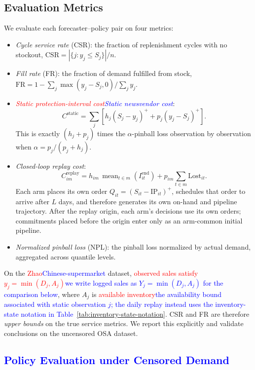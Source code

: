 \documentclass[msom,dblanonrev]{informs4}
\newcommand{\add}[1]{\textcolor{blue}{#1}}
\newcommand{\reduce}[1]{\textcolor{red}{#1}\hspace{0.5em}}
\begin{document}
\subsection{Evaluation Metrics}

We evaluate each forecaster--policy pair on four metrics:

\begin{itemize}
\item \emph{Cycle service rate} (CSR): the fraction of replenishment cycles with no stockout, $\text{CSR} = |\{j : y_j \leq S_j\}| / n$.
\item \emph{Fill rate} (FR): the fraction of demand fulfilled from stock, $\text{FR} = 1 - \sum_j \max(y_j - S_j, 0) / \sum_j y_j$.
\item \reduce{\emph{Static protection-interval cost}}\add{\emph{Static newsvendor cost}}:
  \[
  C^{\mathrm{static}} = \sum_j \left[h_j (S_j-y_j)^+ + p_j (y_j-S_j)^+\right].
  \]
  This is exactly $(h_j+p_j)$ times the $\alpha$-pinball loss observation by observation when $\alpha=p_j/(p_j+h_j)$.
\item \emph{Closed-loop replay cost}:
  \[
  C^{\mathrm{replay}}_{im}
  =h_{im}\,\operatorname{mean}_{t\in m}(I^{\mathrm{end}}_{it})
   +p_{im}\sum_{t\in m}\mathrm{Lost}_{it}.
  \]
  Each arm places its own order $Q_{it}=(S_{it}-\mathrm{IP}_{it})^+$, schedules that order to arrive after $L$ days, and therefore generates its own on-hand and pipeline trajectory.
  After the replay origin, each arm's decisions use its own orders; commitments placed before the origin enter only as an arm-common initial pipeline.
\item \emph{Normalized pinball loss} (NPL): the pinball loss normalized by actual demand, aggregated across quantile levels.
\end{itemize}

On the \reduce{Zhao}\add{Chinese-supermarket} dataset, \reduce{observed sales satisfy $y_j=\min(D_j,A_j)$}\add{we write logged sales as $Y_j=\min(D_j,A_j)$ for the comparison below}, where $A_j$ is \reduce{available inventory}\add{the availability bound associated with static observation $j$; the daily replay instead uses the inventory-state notation in Table~\ref{tab:inventory-state-notation}}.
CSR and FR are therefore \emph{upper bounds} on the true service metrics.
We report this explicitly and validate conclusions on the uncensored OSA dataset.

\subsection{\add{Policy Evaluation under Censored Demand}}\label{sec:censoring-theory}
\end{document}
